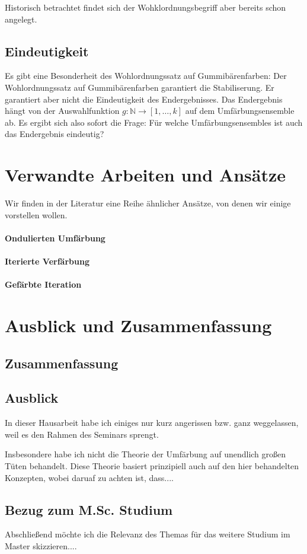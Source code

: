 \documentclass[12pt,ngerman,a4paper]{scrartcl}
\theoremstyle{plain}
\theoremstyle{definition}
\theoremstyle{remark}
\begin{document}
Historisch betrachtet findet sich der Wohklordnungsbegriff aber
bereits schon \citep{riegel-1993} angelegt.

\subsection{Eindeutigkeit}
Es gibt eine Besonderheit des Wohlordnungssatz auf Gummibärenfarben:
Der Wohlordnungssatz auf Gummibärenfarben garantiert die
Stabiliserung.  Er garantiert aber nicht die Eindeutigkeit des
Endergebnisses.  Das Endergebnis hängt von der Auswahlfunktion $g:
\mathbb{N} \to [1, \ldots, k]$ auf dem Umfärbungsensemble ab.  Es
ergibt sich also sofort die Frage: Für welche Umfärbungsensembles ist
auch das Endergebnis eindeutig?

\section{Verwandte Arbeiten und Ansätze}
Wir finden in der Literatur eine Reihe ähnlicher Ansätze, von denen
wir einige vorstellen wollen.

\paragraph{Ondulierten Umfärbung}
\paragraph{Iterierte Verfärbung}
\paragraph{Gefärbte Iteration}

\section{Ausblick und Zusammenfassung}

\subsection{Zusammenfassung}

\subsection{Ausblick}
In dieser Hausarbeit habe ich einiges nur kurz angerissen bzw. ganz
weggelassen, weil es den Rahmen des Seminars sprengt.

Insbesondere habe ich nicht die Theorie der Umfärbung auf unendlich
großen Tüten behandelt.  Diese Theorie basiert prinzipiell auch auf
den hier behandelten Konzepten, wobei daruaf zu achten ist, dass....

\subsection{Bezug zum M.Sc. Studium}
Abschließend möchte ich die Relevanz des Themas für das weitere
Studium im Master skizzieren....



\end{document}
